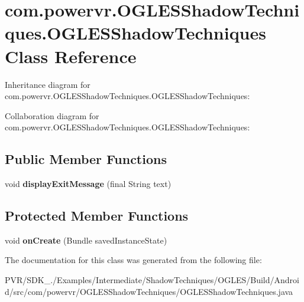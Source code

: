 \hypertarget{classcom_1_1powervr_1_1_o_g_l_e_s_shadow_techniques_1_1_o_g_l_e_s_shadow_techniques}{\section{com.\+powervr.\+O\+G\+L\+E\+S\+Shadow\+Techniques.\+O\+G\+L\+E\+S\+Shadow\+Techniques Class Reference}
\label{classcom_1_1powervr_1_1_o_g_l_e_s_shadow_techniques_1_1_o_g_l_e_s_shadow_techniques}
}


Inheritance diagram for com.\+powervr.\+O\+G\+L\+E\+S\+Shadow\+Techniques.\+O\+G\+L\+E\+S\+Shadow\+Techniques\+:


Collaboration diagram for com.\+powervr.\+O\+G\+L\+E\+S\+Shadow\+Techniques.\+O\+G\+L\+E\+S\+Shadow\+Techniques\+:
\subsection*{Public Member Functions}
\begin{DoxyCompactItemize}
\item 
\hypertarget{classcom_1_1powervr_1_1_o_g_l_e_s_shadow_techniques_1_1_o_g_l_e_s_shadow_techniques_a1d420994e0ddb238fd2b97503ca932c0}{void {\bfseries display\+Exit\+Message} (final String text)}\label{classcom_1_1powervr_1_1_o_g_l_e_s_shadow_techniques_1_1_o_g_l_e_s_shadow_techniques_a1d420994e0ddb238fd2b97503ca932c0}

\end{DoxyCompactItemize}
\subsection*{Protected Member Functions}
\begin{DoxyCompactItemize}
\item 
\hypertarget{classcom_1_1powervr_1_1_o_g_l_e_s_shadow_techniques_1_1_o_g_l_e_s_shadow_techniques_ad58cbed63f45806e52a38667c19ac6b4}{void {\bfseries on\+Create} (Bundle saved\+Instance\+State)}\label{classcom_1_1powervr_1_1_o_g_l_e_s_shadow_techniques_1_1_o_g_l_e_s_shadow_techniques_ad58cbed63f45806e52a38667c19ac6b4}

\end{DoxyCompactItemize}


The documentation for this class was generated from the following file\+:\begin{DoxyCompactItemize}
\item 
P\+V\+R/\+S\+D\+K\+\_./\+Examples/\+Intermediate/\+Shadow\+Techniques/\+O\+G\+L\+E\+S/\+Build/\+Android/src/com/powervr/\+O\+G\+L\+E\+S\+Shadow\+Techniques/O\+G\+L\+E\+S\+Shadow\+Techniques.\+java\end{DoxyCompactItemize}
